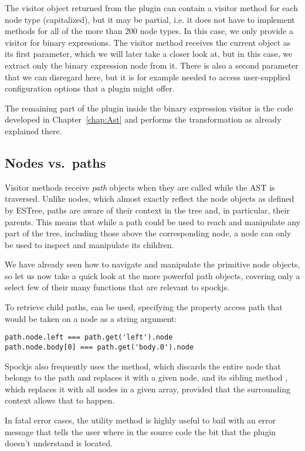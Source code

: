 The visitor object returned from the plugin
can contain a visitor method for each node type (capitalized),
but it may be partial, i.e.
it does not have to implement methods for all of the more than 200 node types.
In this case, we only provide a visitor for binary expressions.
The visitor method receives the current  object as its first parameter,
which we will later take a closer look at,
but in this case, we extract only the binary expression node from it.
There is also a second  parameter
that we can disregard here, but it is for example needed
to access user-supplied configuration options that a plugin might offer.

The remaining part of the plugin inside the binary expression visitor
is the code developed in Chapter~\ref{chap:Ast}
and performs the transformation as already explained there.

\subsection{Nodes vs.\ paths}
Visitor methods receive \textit{path} objects when they are called while the AST is traversed.
Unlike nodes, which almost exactly reflect the node objects as defined by ESTree,
paths are aware of their context in the tree and, in particular, their parents.
This means that while a path could be used to reach and manipulate any part of the tree,
including those above the corresponding node,
a node can only be used to inspect and manipulate its children.

We have already seen how to navigate and manipulate the primitive node objects,
so let us now take a quick look at the more powerful path objects,
covering only a select few of their many functions that are relevant to spockjs.

To retrieve child paths,  can be used,
specifying the property access path that would be taken on a node as a string argument:
\begin{verbatim}
path.node.left === path.get('left').node
path.node.body[0] === path.get('body.0').node
\end{verbatim}

Spockjs also frequently uses the  method,
which discards the entire node that belongs to the path
and replaces it with a given node,
and its sibling method ,
which replaces it with all nodes in a given array,
provided that the surrounding context allows that to happen.

In fatal error cases, the utility method 
is highly useful to bail with an error message
that tells the user where in the source code
the bit that the plugin doesn't understand is located.
